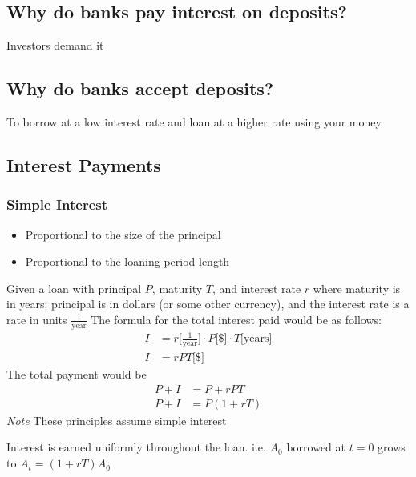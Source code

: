 \documentclass[12pt,letterpaper, twocolumn]{article}
\begin{document}
\subsection*{Why do banks pay interest on deposits? }
Investors demand it
\subsection*{Why do banks accept deposits? }
To borrow at a low interest rate and loan at a higher rate using your money
\subsection{Interest Payments}
\subsubsection{Simple Interest}
\begin{itemize}
    \item Proportional to the size of the principal
    \item Proportional to the loaning period length
\end{itemize}
Given a loan with principal $P$, maturity $T$, and interest rate $r$ where maturity is in years: principal is in dollars (or some other currency), and the interest rate is a rate in units $\frac{1}{\text{year}}$
The formula for the total interest paid would be as follows: 
\begin{align*}
    I &= r \text{[$\frac{1}{\text{year}}$]} \cdot P \text{[\$]} \cdot T \text{[years]}\\
    I &= rPT \text{[\$]}
\end{align*}
The total payment would be
\begin{align*}
    P + I &= P + rPT\\
    P + I &= P(1+rT)
\end{align*}
\textit{Note} These principles assume simple interest

Interest is earned uniformly throughout the loan. 
i.e. $A_0$ borrowed at $t=0$ grows to $A_t=(1+rT)A_0$
\end{document}
